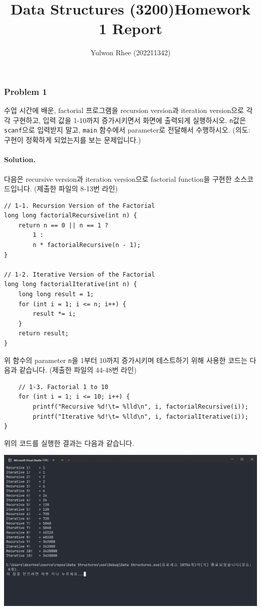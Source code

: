 



\title{Data Structures (3200)\newline\space Homework 1 Report}
\author{Yulwon Rhee (202211342)}

\maketitle
\subsubsection{Problem 1}
수업 시간에 배운, factorial 프로그램을 recursion version과 iteration version으로 각각 구현하고,
입력 값을 1-10까지 증가시키면서 화면에 출력되게 실행하시오.
\texttt{n}값은 \texttt{scanf}으로 입력받지 말고, \texttt{main} 함수에서 parameter로 전달해서 수행하시오.
(의도: 구현이 정확하게 되었는지를 보는 문제입니다.)

\paragraph{Solution.}
다음은 recursive version과 iteration version으로 factorial function을 구현한 소스코드입니다. (제출한 파일의 8-13번 라인)
\begin{verbatim}
// 1-1. Recursion Version of the Factorial
long long factorialRecursive(int n) {
    return n == 0 || n == 1 ?
        1 :
        n * factorialRecursive(n - 1);
}

// 1-2. Iterative Version of the Factorial
long long factorialIterative(int n) {
    long long result = 1;
    for (int i = 1; i <= n; i++) {
        result *= i;
    }
    return result;
}
\end{verbatim}
위 함수의 parameter \texttt{n}을 1부터 10까지 증가시키며 테스트하기 위해 사용한 코드는 다음과 같습니다. (제출한 파일의 44-48번 라인)
\begin{verbatim}
    // 1-3. Factorial 1 to 10
    for (int i = 1; i <= 10; i++) {
        printf("Recursive %d!\t= %lld\n", i, factorialRecursive(i));
        printf("Iterative %d!\t= %lld\n", i, factorialIterative(i));
}
\end{verbatim}
\newpage
위의 코드를 실행한 결과는 다음과 같습니다.

\includegraphics[width=\textwidth]{./img/1.png}
\newpage
